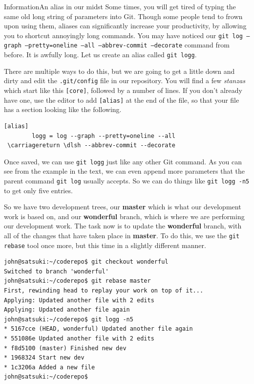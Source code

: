 \begin{callout}{Information}{An alias in our midst}
Some times, you will get tired of typing the same old long string of parameters into Git.
Though some people tend to frown upon using them, aliases can significantly increase your productivity, by allowing you to shortcut annoyingly long commands.
You may have noticed our \texttt{git log --graph --pretty=oneline --all --abbrev-commit --decorate} command from before.
It is awfully long.
Let us create an alias called \texttt{git logg}.

There are multiple ways to do this, but we are going to get a little down and dirty and edit the \texttt{.git/config} file in our repository.
You will find a few \emph{stanzas} which start like this \texttt{[core]}, followed by a number of lines.
If you don't already have one, use the editor to add \texttt{[alias]} at the end of the file, so that your file has a section looking like the following.

\begin{Verbatim}
[alias]
        logg = log --graph --pretty=oneline --all
 \carriagereturn \dlsh --abbrev-commit --decorate
\end{Verbatim}

Once saved, we can use \texttt{git logg} just like any other Git command.
As you can see from the example in the text, we can even append more parameters that the parent command \texttt{git log} usually accepts.
So we can do things like \texttt{git logg -n5} to get only five entries.
\end{callout}

So we have two development trees, our \textbf{master} which is what our development work is based on, and our \textbf{wonderful} branch, which is where we are performing our development work.
The task now is to update the \textbf{wonderful} branch, with all of the changes that have taken place in \textbf{master}.
To do this, we use the \texttt{git rebase} tool once more, but this time in a slightly different manner.

\begin{Verbatim}
john@satsuki:~/coderepo$ git checkout wonderful
Switched to branch 'wonderful'
john@satsuki:~/coderepo$ git rebase master
First, rewinding head to replay your work on top of it...
Applying: Updated another file with 2 edits
Applying: Updated another file again
john@satsuki:~/coderepo$ git logg -n5
* 5167cce (HEAD, wonderful) Updated another file again
* 551086e Updated another file with 2 edits
* f8d5100 (master) Finished new dev
* 1968324 Start new dev
* 1c3206a Added a new file
john@satsuki:~/coderepo$
\end{Verbatim}

